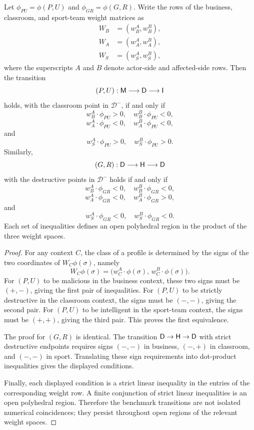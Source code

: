 \begin{proposition}
\label{prop:benchmark-weight-conditions}
Let $\phi_{PU}=\phi(P,U)$ and $\phi_{GR}=\phi(G,R)$. Write the rows of the business, classroom, and sport-team weight matrices as
\[
\begin{aligned}
W_B&=(w_B^A,w_B^B),\\
W_A&=(w_A^A,w_A^B),\\
W_S&=(w_S^A,w_S^B),
\end{aligned}
\]
where the superscripts $A$ and $B$ denote actor-side and affected-side rows. Then the transition
\[
(P,U):\mathsf{M}\longrightarrow\mathsf{D}\longrightarrow\mathsf{I}
\]
holds, with the classroom point in $\mathcal D^-$, if and only if
\[
w_B^A\cdot\phi_{PU}>0,\quad w_B^B\cdot\phi_{PU}<0,
\]
\[
w_A^A\cdot\phi_{PU}<0,\quad w_A^B\cdot\phi_{PU}<0,
\]
and
\[
w_S^A\cdot\phi_{PU}>0,\quad w_S^B\cdot\phi_{PU}>0.
\]
Similarly,
\[
(G,R):\mathsf{D}\longrightarrow\mathsf{H}\longrightarrow\mathsf{D}
\]
with the destructive points in $\mathcal D^-$ holds if and only if
\[
w_B^A\cdot\phi_{GR}<0,\quad w_B^B\cdot\phi_{GR}<0,
\]
\[
w_A^A\cdot\phi_{GR}<0,\quad w_A^B\cdot\phi_{GR}>0,
\]
and
\[
w_S^A\cdot\phi_{GR}<0,\quad w_S^B\cdot\phi_{GR}<0.
\]
Each set of inequalities defines an open polyhedral region in the product of the three weight spaces.
\end{proposition}

\begin{proof}
For any context $C$, the class of a profile is determined by the signs of the two coordinates of $W_C\phi(\sigma)$, namely
\[
W_C\phi(\sigma)=\bigl(w_C^A\cdot\phi(\sigma),\, w_C^B\cdot\phi(\sigma)\bigr).
\]
For $(P,U)$ to be malicious in the business context, these two signs must be $(+,-)$, giving the first pair of inequalities. For $(P,U)$ to be strictly destructive in the classroom context, the signs must be $(-,-)$, giving the second pair. For $(P,U)$ to be intelligent in the sport-team context, the signs must be $(+,+)$, giving the third pair. This proves the first equivalence.

The proof for $(G,R)$ is identical. The transition $\mathsf{D}\to\mathsf{H}\to\mathsf{D}$ with strict destructive endpoints requires signs $(-,-)$ in business, $(-,+)$ in classroom, and $(-,-)$ in sport. Translating these sign requirements into dot-product inequalities gives the displayed conditions.

Finally, each displayed condition is a strict linear inequality in the entries of the corresponding weight row. A finite conjunction of strict linear inequalities is an open polyhedral region. Therefore the benchmark transitions are not isolated numerical coincidences; they persist throughout open regions of the relevant weight spaces.
\end{proof}

